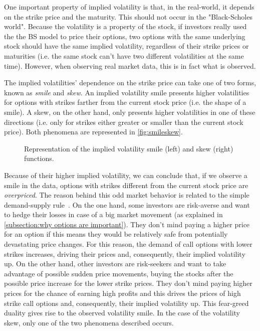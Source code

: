 One important property of implied volatility is that, in the real-world, it depends on the strike price and the maturity. This should not occur in the "Black-Scholes world". Because the volatility is a property of the stock, if investors really used the the BS model to price their options, two options with the same underlying stock should have the same implied volatility, regardless of their strike prices or maturities (i.e. the same stock can't have two different volatilities at the same time).
However, when observing real market data, this is in fact what is observed.

The implied volatilities' dependence on the strike price can take one of two forms, known as \emph{smile} and \emph{skew}.
An implied volatility smile presents higher volatilities for options with strikes farther from the current stock price (i.e. the shape of a smile). A skew, on the other hand, only presents higher volatilities in one of these directions (i.e. only for strikes either greater or smaller than the current stock price). Both phenomena are represented in \autoref{fig:smileskew}.
\begin{figure}[!htb]
  \begin{subfigmatrix}{2}
  \end{subfigmatrix}
  \caption[Representation of the implied volatility smile and skew functions.]{Representation of the implied volatility smile (left) and skew (right) functions.}
  \label{fig:smileskew}
\end{figure}


Because of their higher implied volatility, we can conclude that, if we observe a smile in the data, options with strikes different from the current stock price are \emph{overpriced}.
The reason behind this odd market behavior is related to the simple demand-supply rule~\citep{Wilmott3}. On the one hand, some investors are risk-averse and want to hedge their losses in case of a big market movement (as explained in \autoref{subsection:why options are important}). They don't mind paying a higher price for an option if this means they would be relatively safe from potentially devastating price changes. For this reason, the demand of call options with lower strikes increases, driving their prices and, consequently, their implied volatility up. On the other hand, other investors are risk-seekers and want to take advantage of possible sudden price movements, buying the stocks after the possible price increase for the lower strike prices. They don't mind paying higher prices for the chance of earning high profits and this drives the prices of high strike call options and, consequently, their implied volatility up. This fear-greed duality gives rise to the observed volatility smile. 
In the case of the volatility skew, only one of the two phenomena described occurs.



